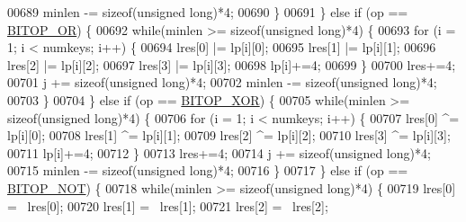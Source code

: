 \begin{DoxyCode}
{00689                     minlen -= \textcolor{keyword}{sizeof}(\textcolor{keywordtype}{unsigned} \textcolor{keywordtype}{long})*4;
00690                 \}
00691             \} \textcolor{keywordflow}{else} \textcolor{keywordflow}{if} (op == \hyperlink{bitops_8c_a3877788c36f67d63804710ce8a80d100}{BITOP\_OR}) \{
00692                 \textcolor{keywordflow}{while}(minlen >= \textcolor{keyword}{sizeof}(\textcolor{keywordtype}{unsigned} \textcolor{keywordtype}{long})*4) \{
00693                     \textcolor{keywordflow}{for} (i = 1; i < numkeys; i++) \{
00694                         lres[0] |= lp[i][0];
00695                         lres[1] |= lp[i][1];
00696                         lres[2] |= lp[i][2];
00697                         lres[3] |= lp[i][3];
00698                         lp[i]+=4;
00699                     \}
00700                     lres+=4;
00701                     j += \textcolor{keyword}{sizeof}(\textcolor{keywordtype}{unsigned} \textcolor{keywordtype}{long})*4;
00702                     minlen -= \textcolor{keyword}{sizeof}(\textcolor{keywordtype}{unsigned} \textcolor{keywordtype}{long})*4;
00703                 \}
00704             \} \textcolor{keywordflow}{else} \textcolor{keywordflow}{if} (op == \hyperlink{bitops_8c_a29fde80dd21281f9ada69d9e65109d14}{BITOP\_XOR}) \{
00705                 \textcolor{keywordflow}{while}(minlen >= \textcolor{keyword}{sizeof}(\textcolor{keywordtype}{unsigned} \textcolor{keywordtype}{long})*4) \{
00706                     \textcolor{keywordflow}{for} (i = 1; i < numkeys; i++) \{
00707                         lres[0] ^= lp[i][0];
00708                         lres[1] ^= lp[i][1];
00709                         lres[2] ^= lp[i][2];
00710                         lres[3] ^= lp[i][3];
00711                         lp[i]+=4;
00712                     \}
00713                     lres+=4;
00714                     j += \textcolor{keyword}{sizeof}(\textcolor{keywordtype}{unsigned} \textcolor{keywordtype}{long})*4;
00715                     minlen -= \textcolor{keyword}{sizeof}(\textcolor{keywordtype}{unsigned} \textcolor{keywordtype}{long})*4;
00716                 \}
00717             \} \textcolor{keywordflow}{else} \textcolor{keywordflow}{if} (op == \hyperlink{bitops_8c_a4fa18b2ac29f1722d9db66461bed3288}{BITOP\_NOT}) \{
00718                 \textcolor{keywordflow}{while}(minlen >= \textcolor{keyword}{sizeof}(\textcolor{keywordtype}{unsigned} \textcolor{keywordtype}{long})*4) \{
00719                     lres[0] = ~lres[0];
00720                     lres[1] = ~lres[1];
00721                     lres[2] = ~lres[2];
}
\end{DoxyCode}
